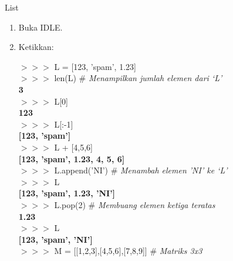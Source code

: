\begin{panduan}{List}
\begin{enumerate}
	\item Buka IDLE.
	\item Ketikkan:
		\begin{IDLE}
		\begin{tabbing}
		$>>>$ L = [123, 'spam', 1.23] ~~~~~~~~~~~~~~~~~~~~~ \= \\
		$>>>$ len(L) \> \# \textit{Menampilkan jumlah elemen dari `L'}\\
		\textbf{3}\\
		$>>>$ L[0]\\
		\textbf{123}\\
		$>>>$ L[:-1]\\
		\textbf{[123, 'spam']}\\
		$>>>$ L + [4,5,6]\\
		\textbf{[123, 'spam', 1.23, 4, 5, 6]}\\
		$>>>$ L.append('NI') \> \# \textit{Menambah elemen 'NI' ke `L'}\\
		$>>>$ L \\
		\textbf{[123, 'spam', 1.23, 'NI']} \\
		$>>>$ L.pop(2) \> \# \textit{Membuang elemen ketiga teratas}\\
		\textbf{1.23} \\
		$>>>$ L \\ 
		\textbf{[123, 'spam', 'NI']} \\
		$>>>$ M = [[1,2,3],[4,5,6],[7,8,9]] \> \# \textit{Matriks 3x3}
		\end{tabbing}
		\end{IDLE}	
\end{enumerate}
\end{panduan}

